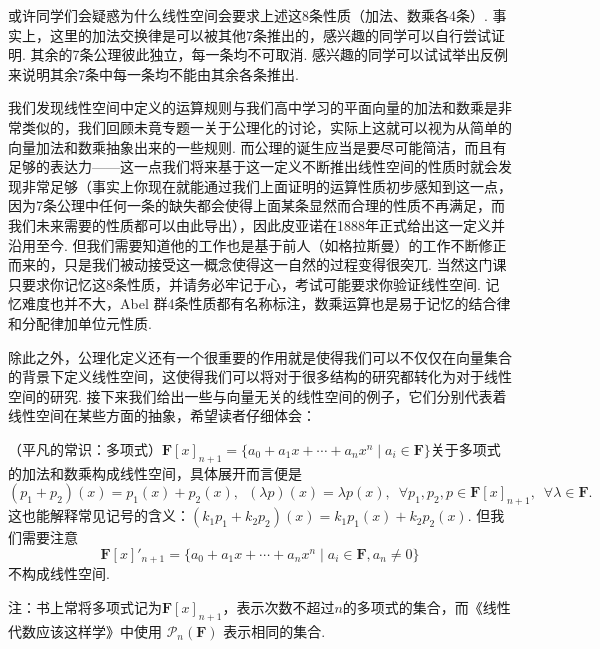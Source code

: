 或许同学们会疑惑为什么线性空间会要求上述这8条性质（加法、数乘各4条）. 事实上，这里的加法交换律是可以被其他7条推出的，感兴趣的同学可以自行尝试证明. 其余的7条公理彼此独立，每一条均不可取消. 感兴趣的同学可以试试举出反例来说明其余7条中每一条均不能由其余各条推出.

我们发现线性空间中定义的运算规则与我们高中学习的平面向量的加法和数乘是非常类似的，我们回顾未竟专题一关于公理化的讨论，实际上这就可以视为从简单的向量加法和数乘抽象出来的一些规则. 而公理的诞生应当是要尽可能简洁，而且有足够的表达力——这一点我们将来基于这一定义不断推出线性空间的性质时就会发现非常足够（事实上你现在就能通过我们上面证明的运算性质初步感知到这一点，因为7条公理中任何一条的缺失都会使得上面某条显然而合理的性质不再满足，而我们未来需要的性质都可以由此导出），因此皮亚诺在1888年正式给出这一定义并沿用至今. 但我们需要知道他的工作也是基于前人（如格拉斯曼）的工作不断修正而来的，只是我们被动接受这一概念使得这一自然的过程变得很突兀. 当然这门课只要求你记忆这8条性质，并请务必牢记于心，考试可能要求你验证线性空间. 记忆难度也并不大，Abel 群4条性质都有名称标注，数乘运算也是易于记忆的结合律和分配律加单位元性质.

除此之外，公理化定义还有一个很重要的作用就是使得我们可以不仅仅在向量集合的背景下定义线性空间，这使得我们可以将对于很多结构的研究都转化为对于线性空间的研究. 接下来我们给出一些与向量无关的线性空间的例子，它们分别代表着线性空间在某些方面的抽象，希望读者仔细体会：

\begin{example}
    （平凡的常识：多项式）$\mathbf{F}[x]_{n+1}=\{a_0+a_1x+\cdots+a_nx^n \mid a_i\in\mathbf{F}\}$关于多项式的加法和数乘构成线性空间，具体展开而言便是
    \[(p_1+p_2)(x)=p_1(x)+p_2(x),\enspace(\lambda p)(x)=\lambda p(x),\enspace\forall p_1,p_2,p\in\mathbf{F}[x]_{n+1},\enspace\forall \lambda\in\mathbf{F}.\]
    这也能解释常见记号的含义：$(k_1p_1+k_2p_2)(x)=k_1p_1(x)+k_2p_2(x)$.
    但我们需要注意
              \[\mathbf{F}[x]'_{n+1}=\{a_0+a_1x+\cdots+a_nx^n \mid a_i\in\mathbf{F}, a_n\neq 0\}\]
              不构成线性空间.

              注：书上常将多项式记为$\mathbf{F}[x]_{n+1}$，表示次数不超过$n$的多项式的集合，而《线性代数应该这样学》中使用 $\mathcal{P}_n(\mathbf{F})$ 表示相同的集合.
\end{example}

